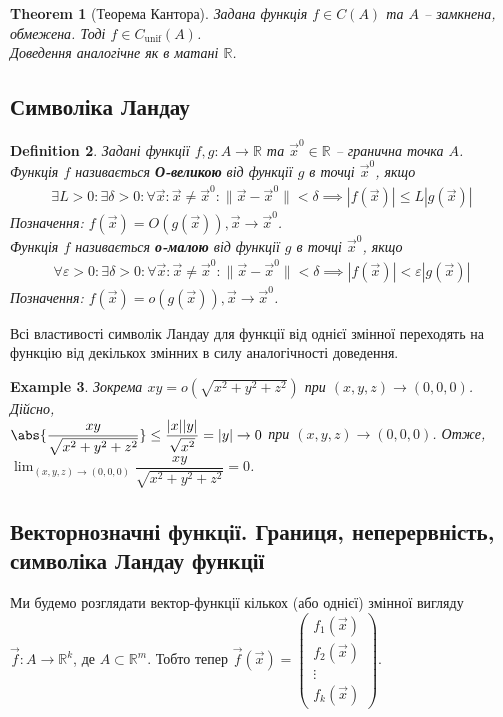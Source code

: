 \documentclass[a4paper, 10pt]{article}
\theoremstyle{theoremdd}
\newtheorem{theorem}{Theorem}[subsection]
\theoremstyle{theoremdd}
\theoremstyle{theoremdd}
\newtheorem{definition}[theorem]{Definition}
\theoremstyle{theoremdd}
\theoremstyle{theoremdd}
\newtheorem{example}[theorem]{Example}
\theoremstyle{theoremdd}
\theoremstyle{theoremdd}
\theoremstyle{theoremdd}
\theoremstyle{theoremdd}
\newcommand\Norm[1]{\|#1\|}
\begin{document}
\begin{theorem}[Теорема Кантора]
Задана функція $f \in C(A)$ та $A$ -- замкнена, обмежена. Тоді $f \in C_{\text{unif}}(A)$.\\
\textit{Доведення аналогічне як в матані $\mathbb{R}$.}
\end{theorem}

\subsection{Символіка Ландау}
\begin{definition}
Задані функції $f,g \colon A \to \mathbb{R}$ та $\vec{x}^0 \in \mathbb{R}$ -- гранична точка $A$.\\
Функція $f$ називається \textbf{О-великою} від функції $g$ в точці $\vec{x}^0$, якщо
\begin{align*}
\exists L>0: \exists \delta > 0: \forall \vec{x}: \vec{x} \neq \vec{x}^0: \Norm{\vec{x} - \vec{x}^0} < \delta \implies |f(\vec{x})| \leq L |g(\vec{x})|
\end{align*}
Позначення: $f(\vec{x}) = O(g(\vec{x})), \vec{x} \to \vec{x}^0$.\\
Функція $f$ називається \textbf{о-малою} від функції $g$ в точці $\vec{x}^0$, якщо
\begin{align*}
\forall \varepsilon>0: \exists \delta > 0: \forall \vec{x}: \vec{x} \neq \vec{x}^0: \Norm{\vec{x} - \vec{x}^0} < \delta \implies |f(\vec{x})| < \varepsilon |g(\vec{x})|
\end{align*}
Позначення: $f(\vec{x}) = o(g(\vec{x})), \vec{x} \to \vec{x}^0$.
\end{definition}

Всі властивості символік Ландау для функції від однієї змінної переходять на функцію від декількох змінних в силу аналогічності доведення.

\begin{example}
Зокрема $xy = o( \sqrt{x^2+y^2+z^2})$ при $(x,y,z) \to (0,0,0)$. Дійсно,\\
$\abs{\dfrac{xy}{\sqrt{x^2+y^2+z^2}}} \leq \dfrac{|x| |y|}{\sqrt{x^2}} = |y| \to 0$ при $(x,y,z) \to (0,0,0)$. Отже,
$\displaystyle\lim_{(x,y,z) \to (0,0,0)} \dfrac{xy}{\sqrt{x^2+y^2+z^2}} = 0$.
\end{example}

\subsection{Векторнозначні функції. Границя, неперервність, символіка Ландау функції}
Ми будемо розглядати вектор-функції кількох (або однієї) змінної вигляду $\vec{f} \colon A \to \mathbb{R}^k$, де $A \subset \mathbb{R}^m$. Тобто тепер $\vec{f}(\vec{x}) = \begin{pmatrix}
f_1(\vec{x}) \\ f_2(\vec{x}) \\ \vdots \\ f_k(\vec{x})
\end{pmatrix}$.
\end{document}
